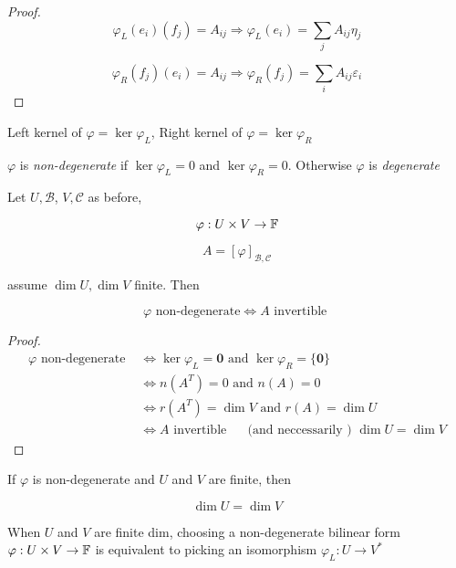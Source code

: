 \documentclass[a4paper]{article}
\begin{document}
\begin{proof}
\[ 	 \varphi_{L}(e_{i})(f_{j}) = A_{ij} \Rightarrow \varphi_{L}(e_{i}) = \sum_{j} A_{ij} \eta_{j} \]
	
	
	\[ \varphi_{R}(f_{j})(e_{i}) = A_{ij} \Rightarrow \varphi_{R}(f_{j}) = \sum_{i} A_{ij} \varepsilon_{i}  \]
\end{proof}


\begin{defi}
	Left kernel of $ \varphi = \ker \varphi_{L} $, Right kernel of $ \varphi = \ker \varphi_{R} $
\end{defi}

\begin{defi}
	$ \varphi $ is \emph{non-degenerate} if $ \ker \varphi_{L} = 0 $ and $ \ker \varphi_{R} = 0 $. Otherwise $ \varphi $ is \emph{degenerate}
\end{defi}

\begin{lemma} 
	Let $ U, \mathcal{B} $, $ V,\mathcal{C} $ as before,
	
	\[ \varphi: U \times V \to \mathbb{F} \]
	
	\[ A = [ \varphi ]_{\mathcal{B},\mathcal{C}} \]
	 
	 assume $ \dim U, \dim V $ finite. Then
	 
	 \[ \varphi \text{ non-degenerate} \iff A \text{ invertible } \]
\end{lemma}

\begin{proof}
	
	
	\begin{align*}
	 \varphi \text{ non-degenerate } & \iff \ker \varphi_{L} = \mathbf{0} \text{ and } \ker \varphi_{R} = \{ \mathbf{0} \} \\
	& \iff n(A^{T}) = 0 \text{ and } n(A) = 0 \\
	& \iff r(A^{T}) = \dim V \text{ and } r(A) = \dim U \\
	& \iff A \text{ invertible } \quad \text{ (and neccessarily ) } \dim U = \dim V \end{align*}
	 
\end{proof}

\begin{cor} 
	If $ \varphi $ is non-degenerate and $ U $ and $ V $ are finite, then 
	
	\[ \dim U = \dim V \]
\end{cor}


\begin{cor} 
	When $ U $ and $ V $ are finite dim, choosing a non-degenerate bilinear form $ \varphi: U \times V \to \mathbb{F} $ is equivalent to picking an isomorphism $ \varphi_{L} : U \to V^{*} $
\end{cor}
\end{document}
